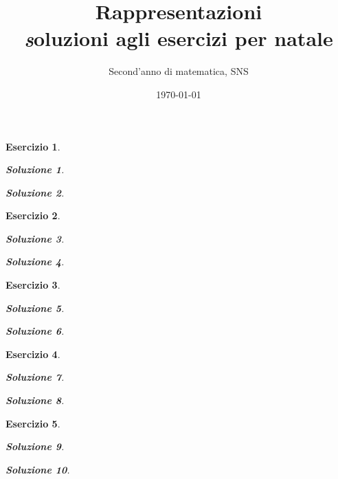\documentclass[a4paper]{article}
\title{Rappresentazioni \\ { \textit soluzioni agli esercizi per natale }}
\author{Second'anno di matematica, SNS}
\date{\today}
\theoremstyle{break}
\newtheorem{ex}{{ \Large Esercizio} }
\theoremstyle{plain}
\newtheorem{sol}{Soluzione}[ex]
\begin{document}
\maketitle

\begin{ex} 


\begin{sol} 

\end{sol}

\begin{sol}

\end{sol}


\end{ex}

\begin{ex}


\begin{sol}

\end{sol}

\begin{sol}

\end{sol}


\end{ex}

\begin{ex}


\begin{sol}

\end{sol}

\begin{sol}

\end{sol}


\end{ex}

\begin{ex}


\begin{sol}

\end{sol}

\begin{sol}

\end{sol}


\end{ex}

\begin{ex}


\begin{sol}

\end{sol}

\begin{sol}

\end{sol}


\end{ex}
\end{document}
